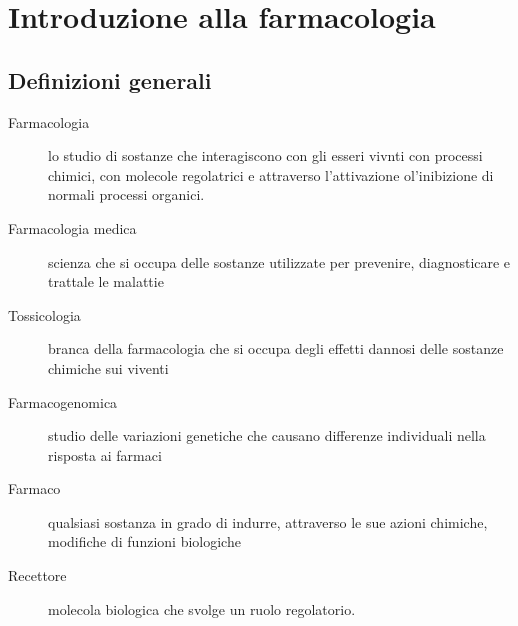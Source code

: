 \newpage\chapter{Introduzione alla farmacologia}

\section{Definizioni generali}

\begin{description}

\item[Farmacologia] lo studio di sostanze che interagiscono con gli esseri vivnti con processi chimici, con molecole regolatrici e attraverso l'attivazione ol'inibizione di normali processi organici.

\item[Farmacologia medica] scienza che si occupa delle sostanze utilizzate per prevenire, diagnosticare e trattale le malattie

\item[Tossicologia] branca della farmacologia che si occupa degli effetti dannosi delle sostanze chimiche sui viventi

\item[Farmacogenomica] studio delle variazioni genetiche che causano differenze individuali nella risposta ai farmaci

\item[Farmaco] qualsiasi sostanza in grado di indurre, attraverso le sue azioni chimiche, modifiche di funzioni biologiche


\item[Recettore] molecola biologica che svolge un ruolo regolatorio.

\end{description}



